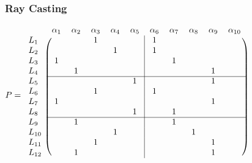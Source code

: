 \documentclass[12pt, compress]{beamer}
\begin{document}
\begin{frame}[fragile]
	\frametitle{Ray Casting}
	$
		P = 
		\begin{blockarray}{lcccccccccc}
		    				& \alpha_1 	& \alpha_2 	& \alpha_3 	& \alpha_4 	& \alpha_5 	& \alpha_6 	& \alpha_7 	& \alpha_8 	& \alpha_9 	& \alpha_{10}	\\
		    \begin{block}{l(ccccc|ccccc@{\hspace*{5pt}})}
			  L_1 	& 	 		& 			& 	1		& 			& 			& 	1		&			&			&			&				\\
			  L_2 	& 			& 			& 			& 	1		& 			& 	1		&			&			&			&				\\
			  L_3 	& 	1		& 			& 			& 			& 			& 			&	1		&			&			&				\\
			  L_4 	& 			& 	1		& 			& 			& 			& 			&			&			&	1		&				\\
			  \cline{2-11}
			  L_5 	& 			& 			& 			& 			& 	1		& 			&			&			&	1		&				\\
			  L_6 	& 			& 			& 	1		& 			& 			& 1			&			&			&			&				\\
			  L_7 	& 		1	& 			& 			& 			& 			& 			&			&			&	1		&				\\
			  L_8 	& 			& 			& 			& 	 		& 	1		& 			&	1		&			&			&				\\
			  \cline{2-11}
			  L_9 	& 			& 	1		& 			& 			& 			& 			&	1		&			& 			&				\\
			  L_{10} 	& 			& 			& 			& 		1	& 			& 			&			&	1		&			&				\\
			  L_{11} 	& 			& 			& 	1		& 			& 			& 			&			&			&	1		&				\\
			  L_{12} 	& 			& 	1		& 			& 	 		& 			& 			&			&			&	1		&				\\			  
		    \end{block}
		\end{blockarray}
	$
\end{frame}
\end{document}
